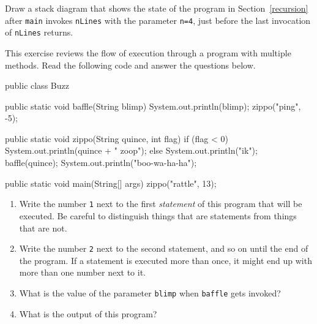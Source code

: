 \documentclass[12pt]{book}
\begin{document}
\begin{exercise}
Draw a stack diagram that shows the state of the program in Section~\ref{recursion} after {\tt main} invokes {\tt nLines} with the parameter {\tt n=4}, just before the last invocation of {\tt nLines} returns.
\end{exercise}

\begin{exercise}
This exercise reviews the flow of execution through a program with multiple methods.
Read the following code and answer the questions below.

\begin{code}
public class Buzz {

    public static void baffle(String blimp) {
        System.out.println(blimp);
        zippo("ping", -5);
    }

    public static void zippo(String quince, int flag) {
        if (flag < 0) {
            System.out.println(quince + " zoop");
        } else {
            System.out.println("ik");
            baffle(quince);
            System.out.println("boo-wa-ha-ha");
        }
    }

    public static void main(String[] args) {
        zippo("rattle", 13);
    }
}
\end{code}

\begin{enumerate}

\item Write the number {\tt 1} next to the first {\em statement} of this program that will be executed.
Be careful to distinguish things that are statements from things that are not.

\item Write the number {\tt 2} next to the second statement, and so on until the end of the program.
If a statement is executed more than once, it might end up with more than one number next to it.

\item What is the value of the parameter {\tt blimp} when {\tt baffle} gets invoked?

\item What is the output of this program?

\end{enumerate}
\end{exercise}
\end{document}
